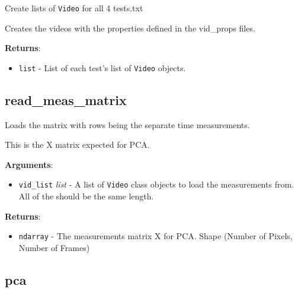 \begin{Shaded}
\begin{Highlighting}[]
\end{Highlighting}
\end{Shaded}

Create lists of \texttt{Video} for all 4 tests.txt

Creates the videos with the properties defined in the vid\_props files.

\textbf{Returns}:

\begin{itemize}
\tightlist
\item
  \texttt{list} - List of each test's list of \texttt{Video} objects.
\end{itemize}

\subsection{read\_meas\_matrix}

\begin{Shaded}
\begin{Highlighting}[]
\end{Highlighting}
\end{Shaded}

Loads the matrix with rows being the separate time measurements.

This is the X matrix expected for PCA.

\textbf{Arguments}:

\begin{itemize}
\tightlist
\item
  \texttt{vid\_list} \emph{list} - A list of \texttt{Video} class
  objects to load the measurements from. All of the should be the same
  length.
\end{itemize}

\textbf{Returns}:

\begin{itemize}
\tightlist
\item
  \texttt{ndarray} - The measurements matrix X for PCA. Shape (Number of
  Pixels, Number of Frames)
\end{itemize}

\subsection{pca}

\begin{Shaded}
\begin{Highlighting}[]
\end{Highlighting}
\end{Shaded}

